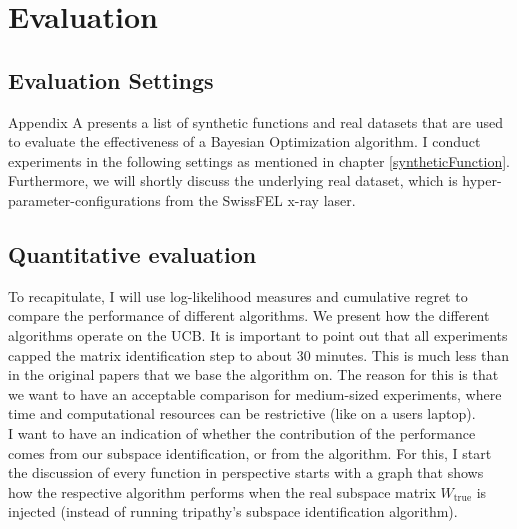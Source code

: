 \chapter{Evaluation}

\ifpdf
    \graphicspath{{07_Chapter6/Figs/Raster/}{07_Chapter6/Figs/PDF/}{07_Chapter6/Figs/}}
\else
    \graphicspath{{07_Chapter6/Figs/Vector/}{07_Chapter6/Figs/}}
\fi

\section{Evaluation Settings}

Appendix A presents a list of synthetic functions and real datasets that are used to evaluate the effectiveness of a Bayesian Optimization algorithm. 
I conduct experiments in the following settings as mentioned in chapter \ref{syntheticFunction}.
Furthermore, we will shortly discuss the underlying real dataset, which is hyper-parameter-configurations from the SwissFEL x-ray laser.

\section{Quantitative evaluation}
To recapitulate, I will use log-likelihood measures and cumulative regret to compare the performance of different algorithms.
We present how the different algorithms operate on the UCB.
It is important to point out that all experiments capped the matrix identification step to about 30 minutes.
This is much less than in the original papers that we base the algorithm on.
The reason for this is that we want to have an acceptable comparison for medium-sized experiments, where time and computational resources can be restrictive (like on a users laptop). \\

I want to have an indication of whether the contribution of the performance comes from our subspace identification, or from the algorithm. 
For this, I start the discussion of every function in perspective starts with a graph that shows how the respective algorithm performs when the real subspace matrix $W_{\text{true}}$ is injected (instead of running tripathy's subspace identification algorithm). \\

